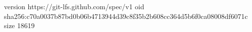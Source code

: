 version https://git-lfs.github.com/spec/v1
oid sha256:c70a0037b87bd0b06b4713944d39c8f35b2b608cc364d5b6f0ca08008df6071c
size 18619
